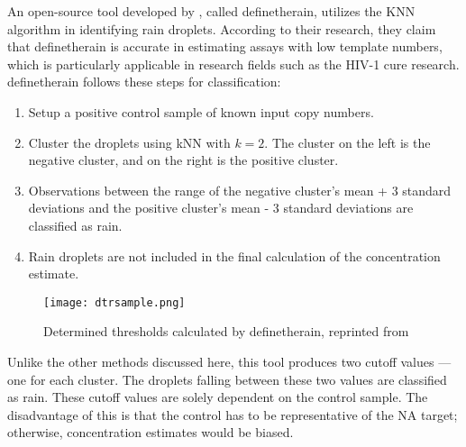 An open-source tool developed by , called definetherain, utilizes the KNN algorithm in identifying rain droplets. According to their research, they claim that definetherain is accurate in estimating assays with low template numbers, which is particularly applicable in research fields such as the HIV-1 cure research. definetherain follows these steps for classification:
\begin{enumerate}
    \item Setup a positive control sample of known input copy numbers. 
    \item Cluster the droplets using kNN with \(k=2\). The cluster on the left is the negative cluster, and on the right is the positive cluster. 
    \item Observations between the range of the negative cluster's mean + 3 standard deviations and the positive cluster's mean - 3 standard deviations are classified as rain.
    \item Rain droplets are not included in the final calculation of the concentration estimate.
\end{enumerate}

\begin{figure}[h]
    \centering
    \texttt{[image: dtrsample.png]}
    \caption[Determined thresholds calculated by definetherain]{Determined thresholds calculated by definetherain, reprinted from \cite{jonesThreshold}}
        \label{fig:dtrsample}
\end{figure}

Unlike the other methods discussed here, this tool produces two cutoff values — one for each cluster. The droplets falling between these two values are classified as rain. These cutoff values are solely dependent on the control sample. The disadvantage of this is that the control has to be representative of the NA target; otherwise, concentration estimates would be biased. 




